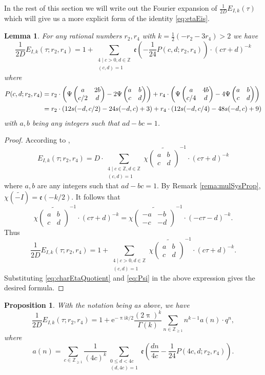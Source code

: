 \documentclass[12pt]{amsart}
\numberwithin{equation}{section}
\theoremstyle{plain}
\newtheorem{prop}[thm]{Proposition}
\newtheorem{lemm}[thm]{Lemma}
\theoremstyle{definition}
\theoremstyle{remark}
\newcommand\twoscript[2]{\substack{{#1} \\ {#2}}}
\newcommand\rmi{\mathrm{i}}
\newcommand\rme{\mathrm{e}}
\newcommand\tbtmat[4]{\left(\begin{smallmatrix}{#1} & {#2} \\ {#3} & {#4}\end{smallmatrix}\right)}
\newcommand\tbtMat[4]{\begin{pmatrix}{#1} & {#2} \\ {#3} & {#4}\end{pmatrix}}
\newcommand\etp[1]{\mathfrak{e}\left(#1\right)}
\newcommand\numZ{\mathbb{Z}}
\newcommand\numgeq[2]{\mathbb{#1}_{\geq #2}}
\begin{document}
In the rest of this section we will write out the Fourier expansion of $\frac{1}{2D}E_{I,k}(\tau)$ which will give us a more explicit form of the identity \eqref{eq:etaEis}.
\begin{lemm}
For any rational numbers $r_2,r_4$ with $k=\frac{1}{2}(-r_2-3r_4)>2$ we have
\begin{equation*}
\frac{1}{2D}E_{I,k}(\tau;r_2,r_4)=1+\sum_{\twoscript{4\mid c>0,d\in\numZ}{(c,d)=1}}\etp{-\frac{1}{24}P(c,d;r_2,r_4)}\cdot(c\tau+d)^{-k}
\end{equation*}
where
\begin{align}
P(c,d;r_2,r_4)&=r_2\cdot\left(\Psi\tbtMat{a}{2b}{c/2}{d}-2\Psi\tbtMat{a}{b}{c}{d}\right)+r_4\cdot\left(\Psi\tbtMat{a}{4b}{c/4}{d}-4\Psi\tbtMat{a}{b}{c}{d}\right)\notag\\
&=r_2\cdot\left(12s(-d,c/2)-24s(-d,c)+3\right)+r_4\cdot\left(12s(-d,c/4)-48s(-d,c)+9\right)\label{eq:Pcdr2r4}
\end{align}
with $a,b$ being any integers such that $ad-bc=1$.
\end{lemm}
\begin{proof}
According to \cite[Lemma 3.2]{Zhu23},
\begin{equation*}
E_{I,k}(\tau;r_2,r_4)=D\cdot\sum_{\twoscript{4\mid c\in\numZ,d\in\numZ}{(c,d)=1}}\chi\widetilde{\tbtmat{a}{b}{c}{d}}^{-1}\cdot(c\tau+d)^{-k}
\end{equation*}
where $a,b$ are any integers such that $ad-bc=1$. By Remark \ref{rema:mulSysProp}, $\chi\left(\widetilde{-I}\right)=\etp{-k/2}$. It follows that
\begin{equation*}
\chi\widetilde{\tbtmat{a}{b}{c}{d}}^{-1}\cdot(c\tau+d)^{-k}=\chi\widetilde{\tbtmat{-a}{-b}{-c}{-d}}^{-1}\cdot(-c\tau-d)^{-k}.
\end{equation*}
Thus
\begin{equation*}
\frac{1}{2D}E_{I,k}(\tau;r_2,r_4)=1+\sum_{\twoscript{4\mid c>0,d\in\numZ}{(c,d)=1}}\chi\widetilde{\tbtmat{a}{b}{c}{d}}^{-1}\cdot(c\tau+d)^{-k}.
\end{equation*}
Substituting \eqref{eq:charEtaQuotient} and \eqref{eq:Psi} in the above expression gives the desired formula.
\end{proof}
\begin{prop}
\label{prop:EIkr2r4Fourier}
With the notation being as above, we have
\begin{equation*}
\frac{1}{2D}E_{I,k}(\tau;r_2,r_4)=1+\rme^{-\uppi\rmi k/2}\frac{(2\uppi)^k}{\Gamma(k)}\sum_{n \in \numgeq{Z}{1}}n^{k-1}a(n)\cdot q^n,
\end{equation*}
where
\begin{equation*}
a(n)=\sum_{c\in\numgeq{Z}{1}}\frac{1}{(4c)^k}\sum_{\twoscript{0\leq d<4c}{(d,4c)=1}}\etp{\frac{dn}{4c}-\frac{1}{24}P(4c,d;r_2,r_4)}.
\end{equation*}
\end{prop}
\end{document}
